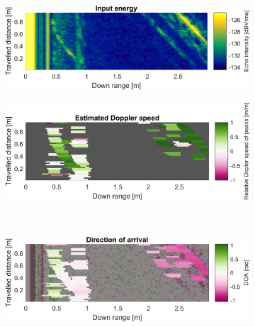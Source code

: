 \begin{figure}[htbp]
    \centering
    \begin{subfigure}[t]{0.475\linewidth}
        \centering
        \includegraphics[width=\linewidth,max height=.475\textheight]{gfx/results/y_input.png}
    \end{subfigure}%
    \hfill%
    \begin{subfigure}[t]{0.475\linewidth}
        \centering
        \includegraphics[width=\linewidth,max height=.475\textheight]{gfx/results/y_doppler.png}
    \end{subfigure}\bigskip\\
    \begin{subfigure}[t]{0.475\linewidth}  
        \centering 
        \includegraphics[width=\linewidth,max height=.475\textheight]{gfx/results/y_doa.png}
    \end{subfigure}%
    \hfill%
    \begin{subfigure}[t]{0.475\linewidth}   
        \centering 

\end{subfigure}
\end{figure}
